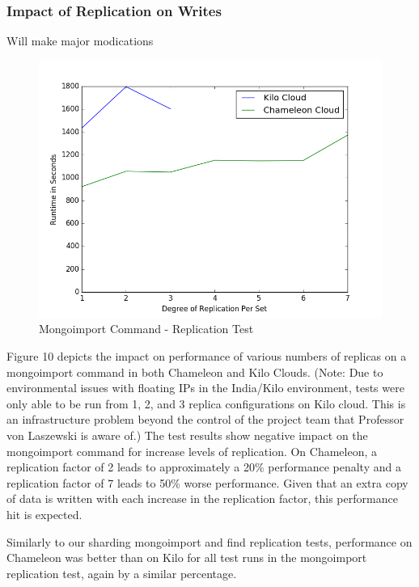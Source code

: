 \documentclass[9pt,twocolumn,twoside]{styles/osajnl}
\begin{document}
\subsubsection{Impact of Replication on Writes}

Will make major modications

\begin{figure}[!ht]
  \includegraphics[scale=0.45]{images/replica_import.png}
  \caption{Mongoimport Command - Replication Test}
\end{figure}


Figure 10 depicts the impact on performance of various numbers of replicas on a mongoimport command in both Chameleon and Kilo Clouds.  (Note: Due to environmental issues with floating IPs in the India/Kilo environment, tests were only able to be run from 1, 2, and 3 replica configurations on Kilo cloud.  This is an infrastructure problem beyond the control of the project team that Professor von Laszewski is aware of.)  The test results show negative impact on the mongoimport command for increase levels of replication.  On Chameleon, a replication factor of 2 leads to approximately a 20\% performance penalty and a replication factor of 7 leads to 50\% worse performance.  Given that an extra copy of data is written with each increase in the replication factor, this performance hit is expected.  

Similarly to our sharding mongoimport and find replication tests, performance on Chameleon was better than on Kilo for all test runs in the mongoimport replication test, again by a similar percentage.
\end{document}

